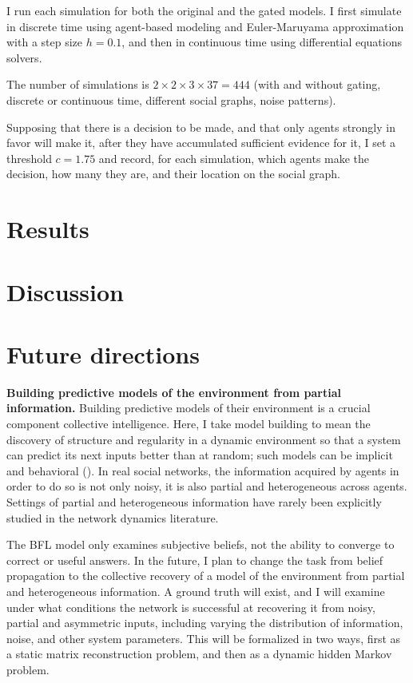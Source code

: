 \documentclass[]{article}
\begin{document}
I run each simulation for both the original and the gated models. I first simulate in discrete time using agent-based modeling and Euler-Maruyama approximation with a step size $h = 0.1$, and then in continuous time using differential equations solvers.

The number of simulations is $2 \times 2 \times 3 \times 37 = 444$ (with and without gating, discrete or continuous time, different social graphs, noise patterns).

Supposing that there is a decision to be made, and that only agents strongly in favor will make it, after they have accumulated sufficient evidence for it, I set a threshold $c = 1.75$ and record, for each simulation, which agents make the decision, how many they are, and their location on the social graph.


\section{Results}


\section{Discussion}


\section{Future directions}

\textbf{Building predictive models of the environment from partial information.} Building predictive models of their environment is a crucial component collective intelligence. Here, I take model building to mean the discovery of structure and regularity in a dynamic environment so that a system can predict its next inputs better than at random; such models can be implicit and behavioral (\cite{crutchfieldCalculiEmergenceComputation1994}). In real social networks, the information acquired by agents in order to do so is not only noisy, it is also partial and heterogeneous across agents. Settings of partial and heterogeneous information have rarely been explicitly studied in the network dynamics literature.

The BFL model only examines subjective beliefs, not the ability to converge to correct or useful answers. In the future, I plan to change the task from belief propagation to the collective recovery of a model of the environment from partial and heterogeneous information. A ground truth will exist, and I will examine under what conditions the network is successful at recovering it from noisy, partial and asymmetric inputs, including varying the distribution of information, noise, and other system parameters. This will be formalized in two ways, first as a static matrix reconstruction problem, and then as a dynamic hidden Markov problem.
\end{document}
